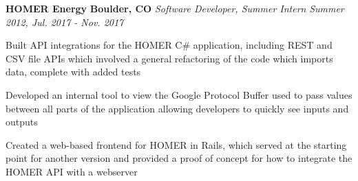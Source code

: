 \item
\headerrow
{\textbf{HOMER Energy}}
{\textbf{Boulder, CO}}
\headerrow
{\emph{Software Developer, Summer Intern}}
{\emph{Summer 2012, Jul. 2017 - Nov. 2017}}
\begin{itemize*}
    \item Built API integrations for the HOMER C\# application, including REST
    and CSV file APIs which involved a general refactoring of the code which
    imports data, complete with added tests
    \item Developed an internal tool to view the Google Protocol Buffer used to
    pass values between all parts of the application allowing developers to
    quickly see inputs and outputs
    \item Created a web-based frontend for HOMER in Rails, which served at the
    starting point for another version and provided a proof of concept for
    how to integrate the HOMER API with a webserver
\end{itemize*}
